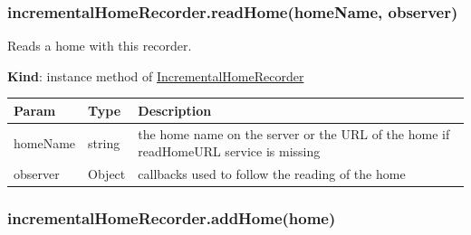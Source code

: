 \documentclass[a4paper]{report}
\begin{document}
\hypertarget{incrementalhomerecorder.readhomehomename-observer}{%
\subsubsection{incrementalHomeRecorder.readHome(homeName,
observer)}\label{incrementalhomerecorder.readhomehomename-observer}}

Reads a home with this recorder.

\textbf{Kind}: instance method of
\protect\hyperlink{IncrementalHomeRecorder}{IncrementalHomeRecorder}

\begin{longtable}[]{@{}lll@{}}
\toprule
\begin{minipage}[b]{0.30\columnwidth}\raggedright
Param\strut
\end{minipage} & \begin{minipage}[b]{0.30\columnwidth}\raggedright
Type\strut
\end{minipage} & \begin{minipage}[b]{0.30\columnwidth}\raggedright
Description\strut
\end{minipage}\tabularnewline
\midrule
\endhead
\begin{minipage}[t]{0.30\columnwidth}\raggedright
homeName\strut
\end{minipage} & \begin{minipage}[t]{0.30\columnwidth}\raggedright
string\strut
\end{minipage} & \begin{minipage}[t]{0.30\columnwidth}\raggedright
the home name on the server or the URL of the home if readHomeURL
service is missing\strut
\end{minipage}\tabularnewline
\begin{minipage}[t]{0.30\columnwidth}\raggedright
observer\strut
\end{minipage} & \begin{minipage}[t]{0.30\columnwidth}\raggedright
Object\strut
\end{minipage} & \begin{minipage}[t]{0.30\columnwidth}\raggedright
callbacks used to follow the reading of the home\strut
\end{minipage}\tabularnewline
\bottomrule
\end{longtable}

\hypertarget{incrementalhomerecorder.addhomehome}{%
\subsubsection{incrementalHomeRecorder.addHome(home)}\label{incrementalhomerecorder.addhomehome}}
\end{document}
